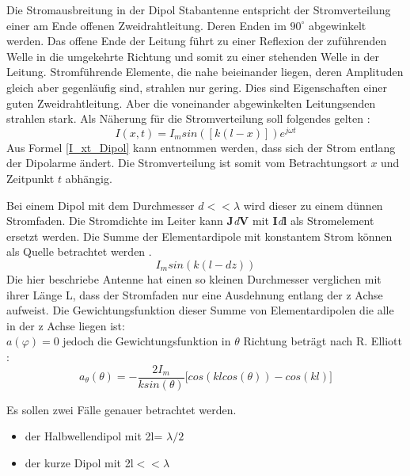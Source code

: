 Die Stromausbreitung in der Dipol Stabantenne entspricht der Stromverteilung einer am Ende offenen Zweidrahtleitung. Deren Enden im $90^\circ$ abgewinkelt werden. Das offene Ende der Leitung führt zu einer Reflexion der zuführenden Welle in die umgekehrte Richtung und somit zu einer stehenden Welle in der Leitung. Stromführende Elemente, die nahe beieinander liegen, deren Amplituden gleich aber gegenläufig sind, strahlen nur gering. Dies sind Eigenschaften einer guten Zweidrahtleitung. Aber die voneinander abgewinkelten Leitungsenden strahlen stark.
Als Näherung für die Stromverteilung soll folgendes gelten \cite{elliott1981antenna}:
\begin{equation}\label{I_xt_Dipol} 
I(x,t) =I_{m}sin([k(l-x)])e^{j\omega t}
\end{equation}
Aus Formel \ref{I_xt_Dipol} kann entnommen werden, dass sich der Strom entlang der Dipolarme ändert. Die Stromverteilung ist somit vom Betrachtungsort $x$ und Zeitpunkt $t$ abhängig.


Bei einem Dipol mit dem Durchmesser $d<<\lambda$ wird dieser zu einem dünnen Stromfaden. Die Stromdichte im Leiter kann \textbf{J}\textit{d}\textbf{\textbf{V}} mit \textbf{I}\textit{d}\textbf{\textbf{l}} als Stromelement ersetzt werden. Die Summe der Elementardipole mit konstantem Strom können als Quelle betrachtet werden \cite{elliott1981antenna}.\\

\begin{equation}
I_{m}sin(k(l-dz))
\end{equation}
Die hier beschriebe Antenne hat einen so kleinen Durchmesser verglichen mit ihrer Länge L, dass der Stromfaden nur eine Ausdehnung entlang der z Achse aufweist. Die Gewichtungsfunktion dieser Summe von Elementardipolen die alle in der z Achse liegen ist:\\
$a(\varphi)= 0$
jedoch die Gewichtungsfunktion in $\theta$ Richtung beträgt nach R. Elliott \cite{elliott1981antenna}:
\begin{equation}\label{eq:Gewichtungsfunktion}
a_{\theta}(\theta)=- \frac{2I_{m}}{k sin(\theta)} \lbrack cos(kl cos(\theta)) - cos(kl) \rbrack
\end{equation}

Es sollen zwei Fälle genauer betrachtet werden.
\begin{itemize}
\item der Halbwellendipol mit 2l= $\lambda/2$
\item der kurze Dipol mit 2l$<<\lambda$
\end{itemize}
